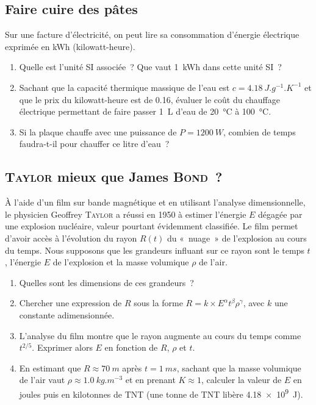 \documentclass[../main/main.tex]{subfiles}
\begin{document}
\subsection{Faire cuire des pâtes}
Sur une facture d'électricité, on peut lire sa consommation d'énergie électrique
exprimée en \si{kWh} (kilowatt-heure).
\begin{enumerate}
    \item Quelle est l'unité SI associée~? Que vaut \SI{1}{kWh} dans cette unité
        SI~?
    \item Sachant que la capacité thermique massique de l'eau est $c = \SI{4.18}{J.g^{-1}.K^{-1}}$ et que le prix du
    kilowatt-heure est de \SI{0.16}{\EUR}, évaluer le coût du chauffage électrique
    permettant de faire passer \SI{1}{L} d'eau de \SI{20}{\degreeCelsius} à
    \SI{100}{\degreeCelsius}.
\item Si la plaque chauffe avec une puissance de $P = \SI{1200}{W}$, combien de
    temps faudra-t-il pour chauffer ce litre d'eau~?
\end{enumerate}

\subsection{\textsc{Taylor} mieux que James \textsc{Bond}~?}

À l'aide d'un film sur bande magnétique et en utilisant l'analyse
dimensionnelle, le physicien Geoffrey \textsc{Taylor} a réussi en 1950 à estimer
l'énergie $E$ dégagée par une explosion nucléaire, valeur pourtant évidemment
classifiée. Le film permet d'avoir accès à l'évolution du rayon $R(t)$ du
«~nuage~» de l'explosion au cours du temps. Nous supposons que les grandeurs
influant sur ce rayon sont le temps $t$, l'énergie $E$ de l'explosion et la
masse volumique $\rho$ de l'air.
\begin{enumerate}
    \item Quelles sont les dimensions de ces grandeurs~?
    \item Chercher une expression de $R$ sous la forme $R = k\times
        E^{\alpha}t^\beta\rho^\gamma$, avec $k$ une constante adimensionnée.
    \item L'analyse du film montre que le rayon augmente au cours du temps comme
        $t^{2/5}$. Exprimer alors $E$ en fonction de $R$, $\rho$ et $t$.
    \item En estimant que $R\approx \SI{70}{m}$ après $t = \SI{1}{ms}$, sachant
        que la masse volumique de l'air vaut $\rho\approx \SI{1.0}{kg.m^{-3}}$
        et en prenant $K\approx 1$, calculer la valeur de $E$ en joules puis en
        kilotonnes de TNT (une tonne de TNT libère \SI{4.18e9}{J}).
\end{enumerate}
\end{document}
